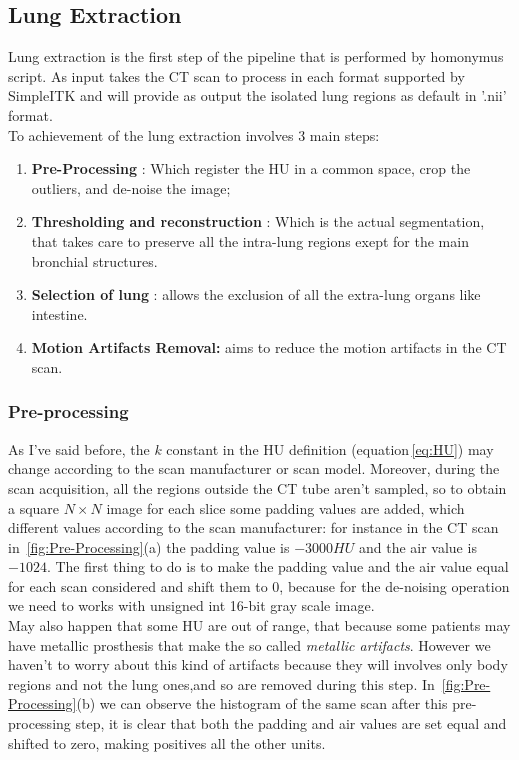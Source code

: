 \documentclass{standalone}
\begin{document}
	\subsection{Lung Extraction}
	
	Lung extraction is the first step of the pipeline that is performed by homonymus script. As input takes the CT scan to process in each format supported by SimpleITK and will provide as output the isolated lung regions as default in '.nii' format.\\
	To achievement of the lung extraction involves 3 main steps: 
	  
	\begin{enumerate}
		\item \textbf{Pre-Processing} :  Which register the HU in a common space, crop the outliers, and de-noise the image;
		
		\item \textbf{Thresholding and reconstruction} : Which is the actual segmentation, that takes care to preserve all the intra-lung regions exept for the main bronchial structures.
		
		\item \textbf{Selection of lung} : allows the exclusion of all the extra-lung organs like intestine.
		
		\item \textbf{Motion Artifacts Removal:} aims to reduce the motion artifacts in the CT scan.
	\end{enumerate}

	
	\subsubsection{Pre-processing} 
	
	As I've said before, the $k$ constant in the HU definition (equation\,\ref{eq:HU}) may change according to the scan manufacturer or scan model. Moreover, during the scan acquisition, all the regions outside the CT tube aren't sampled, so to obtain a square $N\times N$ image for each slice some padding values are added, which different values according to the scan manufacturer: for instance in the CT scan in \figurename\,\ref{fig:Pre-Processing}(a) the padding value is $-3000 HU$ and the air value is $-1024$. The first thing to do is to make the padding value and the air value equal for each scan considered and shift them to $0$, because for the de-noising operation we need to works with unsigned int 16-bit gray scale image.\\
	May also happen that some HU are out of range, that because some patients may have metallic prosthesis that make the so called \textit{metallic artifacts}. However we haven't to worry about this kind of artifacts because they will involves only body regions and not the lung ones,and so are removed during this step.
	In \figurename\,\ref{fig:Pre-Processing}(b) we can observe the histogram of the same scan after this pre-processing step, it is clear that both the padding and air values are set equal and shifted to zero, making positives all the other units.
	
\end{document}
